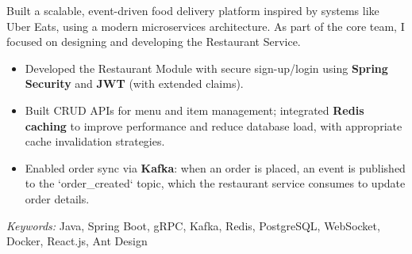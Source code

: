 \nointent
{}

\nointent
Built a scalable, event-driven food delivery platform inspired by systems like Uber Eats, using a modern microservices architecture. As part of the core team, I focused on designing and developing the Restaurant Service.

\begin{itemize}
    \item Developed the Restaurant Module with secure sign-up/login using \textbf{Spring Security} and \textbf{JWT} (with extended claims).
    \item Built CRUD APIs for menu and item management; integrated \textbf{Redis caching} to improve performance and reduce database load, with appropriate cache invalidation strategies.
    \item Enabled order sync via \textbf{Kafka}: when an order is placed, an event is published to the `order\_created` topic, which the restaurant service consumes to update order details.
\end{itemize}

\nointent
\textit{Keywords:} Java, Spring Boot, gRPC, Kafka, Redis, PostgreSQL, WebSocket, Docker, React.js, Ant Design
